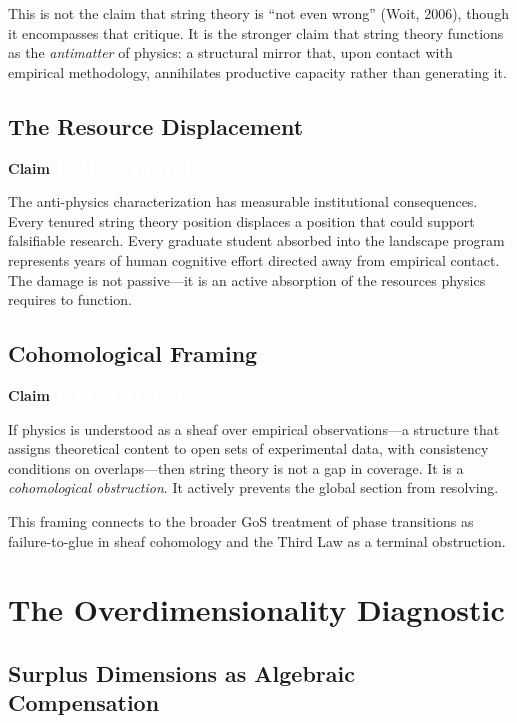 \documentclass[11pt,letterpaper]{article}
\newcommand{\demonstrated}{\texorpdfstring{\colorbox{demonstrated}{\textcolor{white}{\scriptsize\textbf{\,DEMONSTRATED\,}}}}{ [DEMONSTRATED]}}
\newcommand{\conjectured}{\texorpdfstring{\colorbox{conjectured}{\textcolor{white}{\scriptsize\textbf{\,CONJECTURED\,}}}}{ [CONJECTURED]}}
\newenvironment{claim}[1]{%
  \par\medskip\noindent\textbf{Claim} #1\quad\itshape
}{%
  \par\medskip
}
\begin{document}
This is not the claim that string theory is ``not even wrong'' (Woit, 2006), though it encompasses that critique. It is the stronger claim that string theory functions as the \emph{antimatter} of physics: a structural mirror that, upon contact with empirical methodology, annihilates productive capacity rather than generating it.

\subsection{The Resource Displacement}

\begin{claim}{\demonstrated}
The anti-physics characterization has measurable institutional consequences. Every tenured string theory position displaces a position that could support falsifiable research. Every graduate student absorbed into the landscape program represents years of human cognitive effort directed away from empirical contact. The damage is not passive---it is an active absorption of the resources physics requires to function.
\end{claim}

\subsection{Cohomological Framing}

\begin{claim}{\conjectured}
If physics is understood as a sheaf over empirical observations---a structure that assigns theoretical content to open sets of experimental data, with consistency conditions on overlaps---then string theory is not a gap in coverage. It is a \emph{cohomological obstruction}. It actively prevents the global section from resolving.
\end{claim}

This framing connects to the broader GoS treatment of phase transitions as failure-to-glue in sheaf cohomology and the Third Law as a terminal obstruction.


\section{The Overdimensionality Diagnostic}

\subsection{Surplus Dimensions as Algebraic Compensation}
\end{document}
